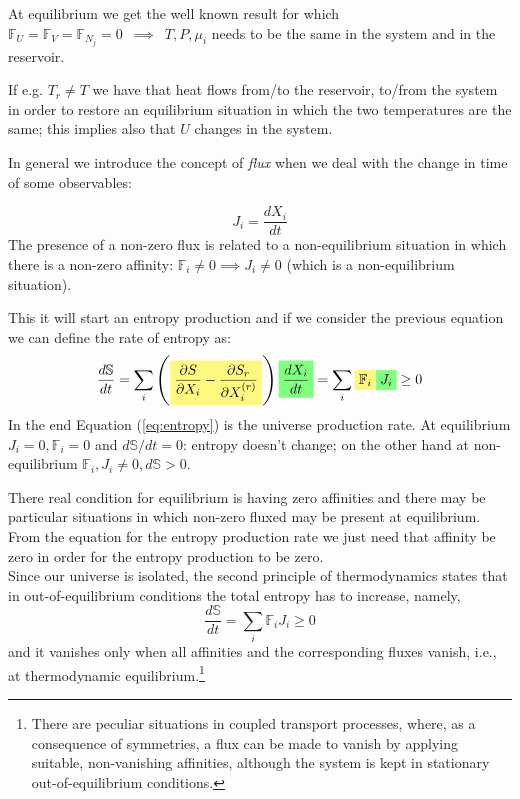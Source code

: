 \documentclass[\main/main.tex]{subfiles}
\begin{document}
At equilibrium we get the well known result for which $\mathbb{F}_U=\mathbb{F}_V=\mathbb{F}_{N_j} = 0 \,\,\, \implies \,\,\, T,P,\mu_i$ needs to be the same in the system and in the reservoir.

If e.g. $T_r\neq T$ we have that heat flows from/to the reservoir, to/from the system in order to restore an equilibrium situation in which the two temperatures are the same; this implies also that $U$ changes in the system.

In general we introduce the concept of \textit{flux} when we deal with the change in time of some observables:

\begin{equation}
    J_i=\frac{d X_i}{dt}
\end{equation}
The presence of a non-zero flux is related to a non-equilibrium situation in which there is a non-zero affinity: $\mathbb{F}_i \neq 0 \implies J_i \neq 0$
(which is a non-equilibrium situation).

This it will start an entropy production and if we consider the previous equation we can define the rate of entropy as:
\begin{equation}
    \frac{d \mathbb{S}}{d t}=\sum_{i}\left(\hlc{yellow}{\frac{\partial S}{\partial X_{i}}-\frac{\partial S_{r}}{\partial X_{i}^{(r)}}}\right) \hlc{green}{\frac{d X_{i}}{d t}}=\sum_{i} \hlc{yellow}{\mathbb{F}_{i}} \hlc{green}{J_{i}} \geq 0
    \label{eq:entropy}
\end{equation}
In the end Equation (\ref{eq:entropy}) is the universe production rate. At equilibrium $J_i=0,\mathbb{F}_i=0$ and $d\mathbb{S}/dt=0$: entropy doesn't change; on the other hand at non-equilibrium $\mathbb{F}_i, J_i \neq 0, d\mathbb{S}>0$.

There real condition for equilibrium is having zero affinities and there may be particular situations in which non-zero fluxed may be present at  equilibrium. From the equation for the entropy production rate we just need that affinity be zero in order for the entropy production to be zero. \\

Since our universe is isolated, the second principle of thermodynamics states that in out-of-equilibrium conditions the total entropy has to increase, namely,
$$
\frac{d \mathbb{S}}{d t}=\sum_{i} \mathbb{F}_{i} J_{i} \geq 0
$$
and it vanishes only when all affinities and the corresponding fluxes vanish, i.e., at thermodynamic equilibrium.\footnote{There are peculiar situations in coupled transport processes, where, as a consequence of
symmetries, a flux can be made to vanish by applying suitable, non-vanishing affinities, although the system is
kept in stationary out-of-equilibrium conditions.}
\end{document}
